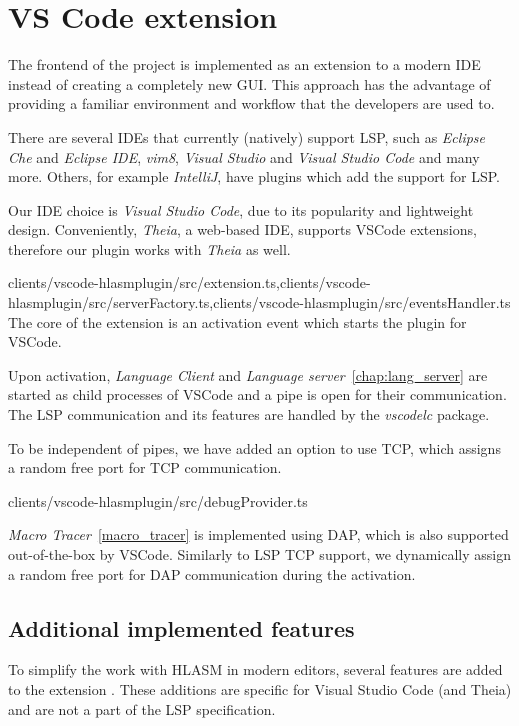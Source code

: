 \chapter{VS Code extension}
\label{extension}
The frontend of the project is implemented as an extension to a modern IDE instead of creating a completely new GUI. This approach has the advantage of providing a familiar environment and workflow that the developers are used to.

There are several IDEs that currently (natively) support LSP, such as \emph{Eclipse Che} and \emph{Eclipse IDE}, \emph{vim8}, \emph{Visual Studio} and \emph{Visual Studio Code} and many more. Others, for example \emph{IntelliJ}, have plugins which add the support for LSP.

Our IDE choice is \emph{Visual Studio Code}, due to its popularity and lightweight design. Conveniently, \emph{Theia}, a web-based IDE, supports VSCode extensions, therefore our plugin works with \emph{Theia} as well.

{clients/vscode-hlasmplugin/src/extension.ts,clients/vscode-hlasmplugin/src/serverFactory.ts,clients/vscode-hlasmplugin/src/eventsHandler.ts}
The core of the extension is an activation event which starts the plugin for VSCode.

Upon activation, \emph{Language Client} and \emph{Language server}~\ref{chap:lang_server} are started as child processes of VSCode and a pipe is open for their communication. The LSP communication and its features are handled by the \emph{vscodelc} package. 

To be independent of pipes, we have added an option to use TCP, which assigns a random free port for TCP communication.

{clients/vscode-hlasmplugin/src/debugProvider.ts}


\emph{Macro Tracer}~\ref{macro_tracer} is implemented using DAP, which is also supported out-of-the-box by VSCode. Similarly to LSP TCP support, we dynamically assign a random free port for DAP communication during the activation.

\section{Additional implemented features}

To simplify the work with HLASM in modern editors, several features are added to the extension . These additions are specific for Visual Studio Code (and Theia) and are not a part of the LSP specification.

